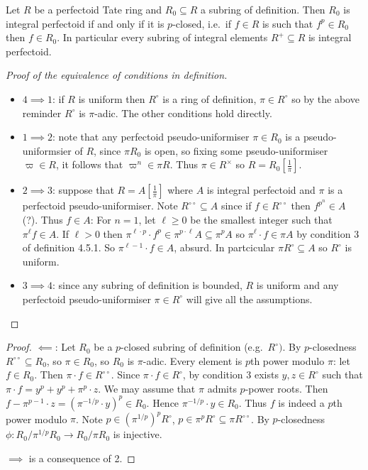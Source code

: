 \documentclass[a4paper]{article}
\begin{document}
\begin{proposition}
  Let \(R\) be a perfectoid Tate ring and \(R_0 \subseteq R\) a subring of definition. Then \(R_0\) is integral perfectoid if and only if it is \(p\)-closed, i.e.\ if \(f \in R\) is such that \(f^p \in R_0\) then \(f \in R_0\). In particular every subring of integral elements \(R^+ \subseteq R\) is integral perfectoid.
\end{proposition}

\begin{proof}[Proof of the equivalence of conditions in definition]\leavevmode
  \begin{itemize}
  \item \(4 \implies 1\): if \(R\) is uniform then \(R^\circ\) is a ring of definition, \(\pi \in R^\circ\) so by the above reminder \(R^\circ\) is \(\pi\)-adic. The other conditions hold directly.
  \item \(1 \implies 2\): note that any perfectoid pseudo-uniformiser \(\pi \in R_0\) is a pseudo-uniformsier of \(R\), since \(\pi R_0\) is open, so fixing some pseudo-uniformiser \(\varpi \in R\), it follows that \(\varpi^n \in \pi R\). Thus \(\pi \in R^\times\) so \(R = R_0[\frac{1}{\pi}]\).
  \item \(2 \implies 3\): suppose that \(R = A[\frac{1}{\pi}]\) where \(A\) is integral perfectoid and \(\pi\) is a perfectoid pseudo-uniformiser. Note \(R^{\circ \circ} \subseteq A\) since if \(f \in R^{\circ \circ}\) then \(f^{p^n} \in A\) (?). Thus \(f \in A\): For \(n = 1\), let \(\ell \geq 0\) be the smallest integer such that \(\pi^\ell f \in A\). If \(\ell > 0\) then \(\pi^{\ell \cdot p} \cdot f^p \in \pi^{p \cdot \ell} A \subseteq \pi^p A\) so \(\pi^\ell \cdot f \in \pi A\) by condition 3 of definition 4.5.1. So \(\pi^{\ell - 1} \cdot f \in A\), absurd. In partcicular \(\pi R^\circ \subseteq A\) so \(R^\circ\) is uniform.
  \item \(3 \implies 4\): since any subring of definition is bounded, \(R\) is uniform and any perfectoid pseudo-uniformiser \(\pi \in R^\circ\) will give all the assumptions.
  \end{itemize}
\end{proof}

\begin{proof}
  \(\impliedby\): Let \(R_0\) be a \(p\)-closed subring of definition (e.g.\ \(R^\circ)\). By \(p\)-closedness \(R^{\circ \circ} \subseteq R_0\), so \(\pi \in R_0\), so \(R_0\) is \(\pi\)-adic. Every element is \(p\)th power modulo \(\pi\): let \(f \in R_0\). Then \(\pi \cdot f \in R^{\circ \circ}\). Since \(\pi \cdot f \in R^\circ\), by condition 3 exists \(y, z \in R^\circ\) such that \(\pi \cdot f = y^p + y^p + \pi^p \cdot z\). We may assume that \(\pi\) admits \(p\)-power roots. Then \(f - \pi^{p - 1} \cdot z = (\pi^{-1/p} \cdot y)^p \in R_0\). Hence \(\pi^{-1/p} \cdot y \in R_0\). Thus \(f\) is indeed a \(p\)th power modulo \(\pi\). Note \(p \in (\pi^{1/p})^pR^{\circ}\), \(p \in \pi^p R^\circ \subseteq \pi R^{\circ \circ}\). By \(p\)-closedness \(\phi: R_0/\pi^{1/p}R_0 \to R_0/\pi R_0\) is injective.

  \(\implies\) is a consequence of 2.
\end{proof}
\end{document}
